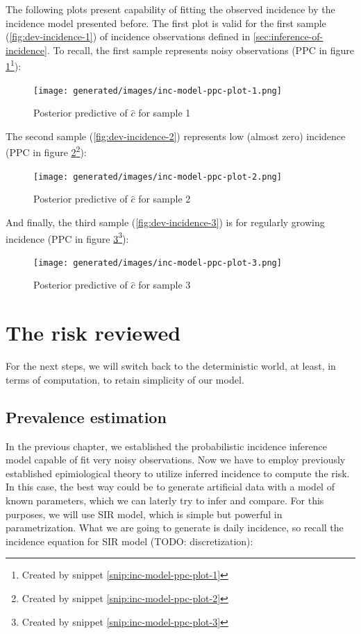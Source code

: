 \documentclass[
  digital, %
  oneside, %
  lof,     %
  lot,     %
]{fithesis4}
\begin{document}
The following plots present capability of fitting the observed
incidence by the incidence model presented before. The first plot
is valid for the first sample (\ref{fig:dev-incidence-1}) of incidence observations defined in \autoref{sec:inference-of-incidence}.
To recall, the first sample represents noisy 
observations (PPC in figure \ref{fig:incidence-posterior-1}\footnote{Created by snippet \ref{snip:inc-model-ppc-plot-1}}):

\begin{figure}[H]
  \centering
  \texttt{[image: generated/images/inc-model-ppc-plot-1.png]}
  \caption{Posterior predictive of $\hat{c}$ for sample 1}
  \label{fig:incidence-posterior-1}
\end{figure}

The second sample (\ref{fig:dev-incidence-2}) represents low (almost zero) 
incidence (PPC in figure \ref{fig:incidence-posterior-2}\footnote{Created by snippet \ref{snip:inc-model-ppc-plot-2}}):

\begin{figure}[H]
  \centering
  \texttt{[image: generated/images/inc-model-ppc-plot-2.png]}
  \caption{Posterior predictive of $\hat{c}$ for sample 2}
  \label{fig:incidence-posterior-2}
\end{figure}

And finally, the third sample (\ref{fig:dev-incidence-3}) is for
regularly growing
incidence (PPC in figure \ref{fig:incidence-posterior-3}\footnote{Created by snippet \ref{snip:inc-model-ppc-plot-3}}):

\begin{figure}[H]
  \centering
  \texttt{[image: generated/images/inc-model-ppc-plot-3.png]}
  \caption{Posterior predictive of $\hat{c}$ for sample 3}
  \label{fig:incidence-posterior-3}
\end{figure}


\chapter{The risk reviewed}

For the next steps, we will switch back to the deterministic 
world, at least, in terms of computation, to retain simplicity of our model.

\section{Prevalence estimation}

In the previous chapter, we established the probabilistic
incidence inference model capable of fit very noisy observations.
Now we have to employ previously established epimiological theory
to utilize inferred incidence to compute the risk.
In this case, the best way could be to generate artificial data
with a model of known parameters, which we can laterly try to
infer and compare.
For this purposes, we will use SIR model, which is simple 
but powerful in parametrization.
What we are going to generate is daily incidence, so recall 
the incidence equation for SIR model (TODO: discretization):
\end{document}
